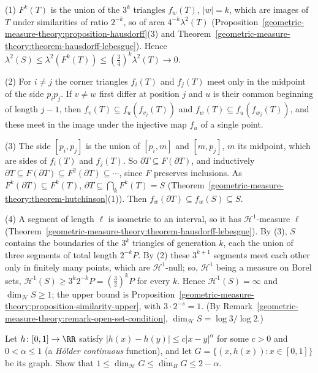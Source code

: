 \begin{solution}
(1) $F^k(T)$ is the union of the $3^k$ triangles $f_w(T)$, $|w| = k$, which are images of $T$ under similarities of ratio $2^{-k}$, so of area $4^{-k}\lambda^2(T)$ (Proposition~\ref{geometric-measure-theory:proposition-hausdorff}(3)
and Theorem~\ref{geometric-measure-theory:theorem-hausdorff-lebesgue}). Hence $\lambda^2(S) \leq \lambda^2(F^k(T)) \leq (\frac34)^k\lambda^2(T) \to 0$.

(2) For $i \neq j$ the corner triangles $f_i(T)$ and $f_j(T)$ meet only in the midpoint of the side $p_ip_j$. If $v \neq w$ first differ at position $j$ and $u$ is their common beginning of length
$j - 1$, then $f_v(T) \subseteq f_u(f_{v_j}(T))$ and $f_w(T) \subseteq f_u(f_{w_j}(T))$, and these meet in the image under the injective map $f_u$ of a single point.

(3) The side $[p_i, p_j]$ is the union of $[p_i, m]$ and $[m, p_j]$, $m$ its midpoint, which are sides of $f_i(T)$ and $f_j(T)$. So $\partial T \subseteq F(\partial T)$, and inductively
$\partial T \subseteq F(\partial T) \subseteq F^2(\partial T) \subseteq \cdots$, since $F$ preserves inclusions. As $F^k(\partial T) \subseteq F^k(T)$, $\partial T \subseteq \bigcap_kF^k(T) = S$
(Theorem~\ref{geometric-measure-theory:theorem-hutchinson}(1)). Then $f_w(\partial T) \subseteq f_w(S) \subseteq S$.

(4) A segment of length $\ell$ is isometric to an interval, so it has $\mathcal{H}^1$-measure $\ell$ (Theorem~\ref{geometric-measure-theory:theorem-hausdorff-lebesgue}). By (3), $S$ contains the boundaries of the $3^k$
triangles of generation $k$, each the union of three segments of total length $2^{-k}P$. By (2) these $3^{k+1}$ segments meet each other only in finitely many points, which are $\mathcal{H}^1$-null; so,
$\mathcal{H}^1$ being a measure on Borel sets, $\mathcal{H}^1(S) \geq 3^k2^{-k}P = (\frac32)^kP$ for every $k$. Hence $\mathcal{H}^1(S) = \infty$ and $\dim_{\mathcal{H}}S \geq 1$; the upper bound is
Proposition~\ref{geometric-measure-theory:proposition-similarity-upper}, with $3 \cdot 2^{-s} = 1$. (By Remark~\ref{geometric-measure-theory:remark-open-set-condition}, $\dim_{\mathcal{H}}S = \log 3/\log 2$.)
\end{solution}

\begin{exercise}\label{geometric-measure-theory:exercise-holder-graph}
Let $h \colon [0, 1] \to \RR$ satisfy $|h(x) - h(y)| \leq c|x - y|^\alpha$ for some $c > 0$ and $0 < \alpha \leq 1$ (a \emph{H\"older continuous} function), and let
$G = \{(x, h(x)) : x \in [0, 1]\}$ be its graph. Show that $1 \leq \dim_{\mathcal{H}}G \leq \overline{\dim}_BG \leq 2 - \alpha$.
\end{exercise}

